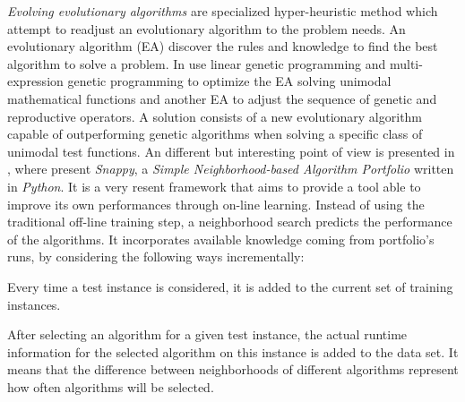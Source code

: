 \textit{Evolving evolutionary algorithms} are specialized hyper-heuristic method which attempt to readjust an evolutionary algorithm to the problem needs. An evolutionary algorithm (EA) discover the rules and knowledge to find the best algorithm to solve a problem. In \cite{Diosan2009}  use linear genetic programming and multi-expression genetic programming to optimize the EA solving unimodal mathematical functions and another EA to adjust the sequence of genetic and reproductive operators. A solution consists of a new evolutionary algorithm capable of outperforming genetic algorithms when solving a specific class of unimodal test functions. An different but interesting point of view is presented in \cite{Samulowitz2013}, where  present \textit{Snappy}, a \textit{Simple Neighborhood-based Algorithm Portfolio} written in \textit{Python}. It is a very resent framework that aims to provide a tool able to improve its own performances through on-line learning. Instead of using the traditional off-line training step, a neighborhood search predicts the performance of the algorithms. It incorporates available knowledge coming from portfolio's runs, by considering the following ways incrementally: \begin{inparaenum}[1-] \item Every time a test instance is considered, it is added to the current set of training instances. \item After selecting an algorithm for a given test instance, the actual runtime information for the selected algorithm on this instance is added to the data set. It means that the difference between neighborhoods of different algorithms represent how often algorithms will be selected. \end{inparaenum}